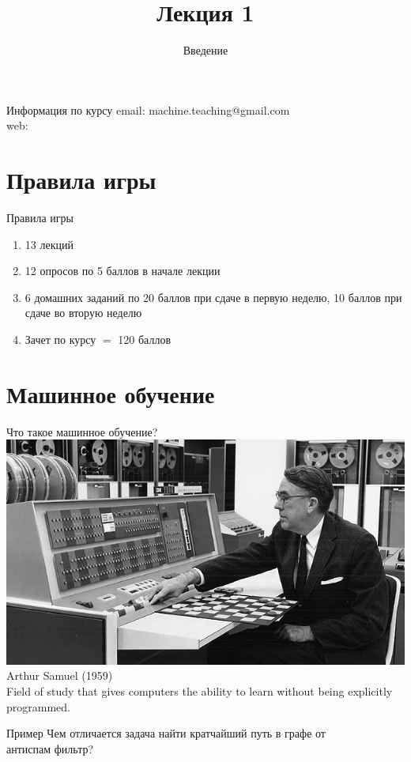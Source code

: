 \documentclass[10pt]{beamer}
\title{Лекция 1}
\subtitle{Введение}
\begin{document}
\maketitle

\begin{frame}{Информация по курсу}
  email: machine.teaching@gmail.com \\
  web: \\
\end{frame}

\section{Правила игры}

\begin{frame}{Правила игры}
  \begin{enumerate} [-]  
    \item 13 лекций
    \item 12 опросов по 5 баллов в начале лекции
    \item 6 домашних заданий по 20 баллов при сдаче в первую неделю, 10 баллов при сдаче во вторую неделю
    \bigbreak
    \item Зачет по курсу $=$ \alert{120 баллов}
  \end{enumerate}  
\end{frame}

\section{Машинное обучение}

\begin{frame}{Что такое машинное обучение?}
  \includegraphics[width=0.5 \linewidth, height=0.5 \textheight, keepaspectratio]{images/samuel}\\
	Arthur Samuel (1959) \\
	\bigbreak
	Field of study that gives computers the ability to learn without being explicitly programmed.
\end{frame}

\begin{frame}{Пример}
  Чем отличается задача \alert{найти кратчайший путь в графе} от\\  \alert{антиспам фильтр}?
\end{frame}
\end{document}
